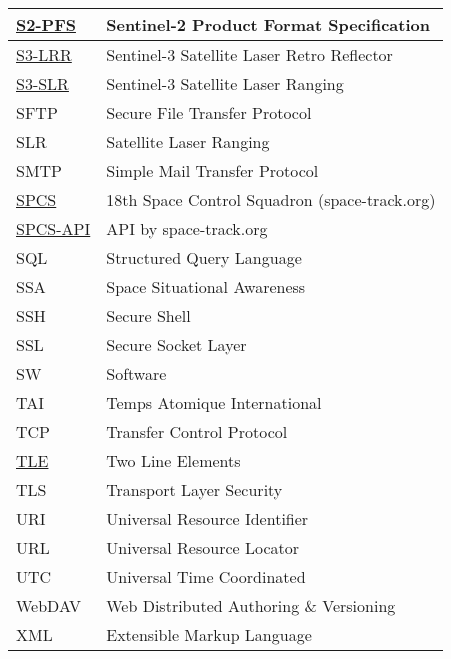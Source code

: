 \documentclass[dec_sum_main.tex]{subfiles}
\begin{document}
\begin{longtable}{|m{2.8cm}|m{10cm}|}
	\href{https://sentinels.copernicus.eu/documents/247904/685211/S2-PDGS-TAS-DI-PSD-V14.9.pdf/3d3b6c9c-4334-dcc4-3aa7-f7c0deffbaf7?t=1643013091529}{S2-PFS} & Sentinel-2 Product Format Specification\\ \hline
	\href{https://sentinels.copernicus.eu/web/sentinel/technical-guides/sentinel-3-altimetry/instrument/lrr}{S3-LRR} & Sentinel-3 Satellite Laser Retro Reflector\\ \hline	
	\href{https://sentinels.copernicus.eu/web/sentinel/technical-guides/sentinel-3-altimetry/pod/slr-tracking}{S3-SLR} & Sentinel-3 Satellite Laser Ranging\\ \hline
	SFTP & Secure File Transfer Protocol \\ \hline
	SLR & Satellite Laser Ranging \\ \hline
	SMTP & Simple Mail Transfer Protocol \\ \hline
	\href{https://www.space-track.org/}{SPCS} & 18th Space Control Squadron (space-track.org) \\ \hline
	\href{https://www.space-track.org/documentation#/api}{SPCS-API} & API by space-track.org \\ \hline
	SQL & Structured Query Language \\ \hline
	SSA & Space Situational Awareness \\ \hline
	SSH & Secure Shell \\ \hline
	SSL & Secure Socket Layer \\ \hline
	SW & Software \\ \hline
	TAI & Temps Atomique International \\ \hline
	TCP & Transfer Control Protocol \\ \hline
	\href{https://www.space-track.org/documentation#tle}{TLE} & Two Line Elements \\ \hline
	TLS & Transport Layer Security \\ \hline
	URI & Universal Resource Identifier \\ \hline
	URL & Universal Resource Locator \\ \hline
	UTC & Universal Time Coordinated \\ \hline
	WebDAV & Web Distributed Authoring \& Versioning \\ \hline
	XML & Extensible Markup Language \\ \hline						
\end{longtable}
\end{document}
